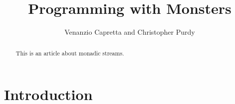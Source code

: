 \documentclass{jfp}
\begin{document}


\totalpg{\pageref{lastpage01}}

\title{Programming with Monsters}

\begin{authgrp}
\author{Venanzio Capretta and Christopher Purdy}
\end{authgrp}

\begin{abstract}
This is an article about monadic streams.
\end{abstract}

\maketitle[F]

\section{Introduction}

\label{lastpage01}
\end{document}
